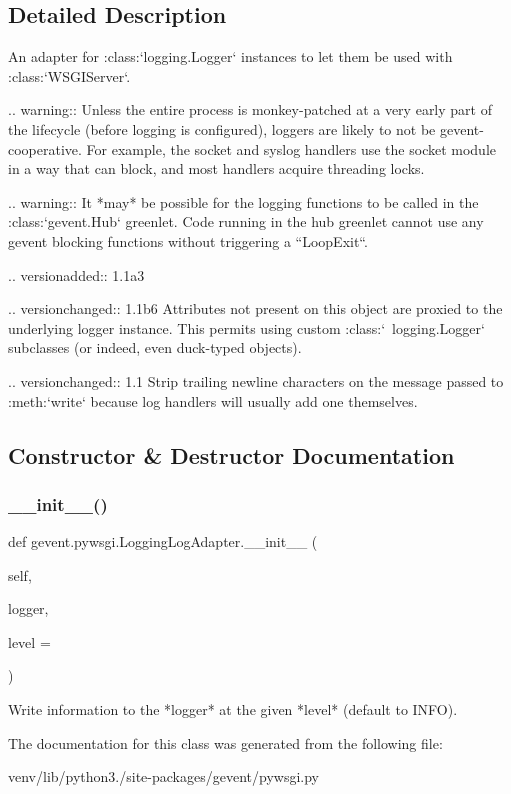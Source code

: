 \subsection{Detailed Description}
\begin{DoxyVerb}An adapter for :class:`logging.Logger` instances
to let them be used with :class:`WSGIServer`.

.. warning:: Unless the entire process is monkey-patched at a very
    early part of the lifecycle (before logging is configured),
    loggers are likely to not be gevent-cooperative. For example,
    the socket and syslog handlers use the socket module in a way
    that can block, and most handlers acquire threading locks.

.. warning:: It *may* be possible for the logging functions to be
   called in the :class:`gevent.Hub` greenlet. Code running in the
   hub greenlet cannot use any gevent blocking functions without triggering
   a ``LoopExit``.

.. versionadded:: 1.1a3

.. versionchanged:: 1.1b6
   Attributes not present on this object are proxied to the underlying
   logger instance. This permits using custom :class:`~logging.Logger`
   subclasses (or indeed, even duck-typed objects).

.. versionchanged:: 1.1
   Strip trailing newline characters on the message passed to :meth:`write`
   because log handlers will usually add one themselves.
\end{DoxyVerb}
 

\subsection{Constructor \& Destructor Documentation}
\mbox{\label{classgevent_1_1pywsgi_1_1_logging_log_adapter_add4f028eb6d5379e6d96f8461b92a4d2}} 
\subsubsection{\texorpdfstring{\+\_\+\+\_\+init\+\_\+\+\_\+()}{\_\_init\_\_()}}
{\footnotesize\ttfamily def gevent.\+pywsgi.\+Logging\+Log\+Adapter.\+\_\+\+\_\+init\+\_\+\+\_\+ (\begin{DoxyParamCaption}\item[{}]{self,  }\item[{}]{logger,  }\item[{}]{level = {} }\end{DoxyParamCaption})}

\begin{DoxyVerb}Write information to the *logger* at the given *level* (default to INFO).
\end{DoxyVerb}
 

The documentation for this class was generated from the following file\+:\begin{DoxyCompactItemize}
\item 
venv/lib/python3./site-\/packages/gevent/pywsgi.\+py\end{DoxyCompactItemize}

